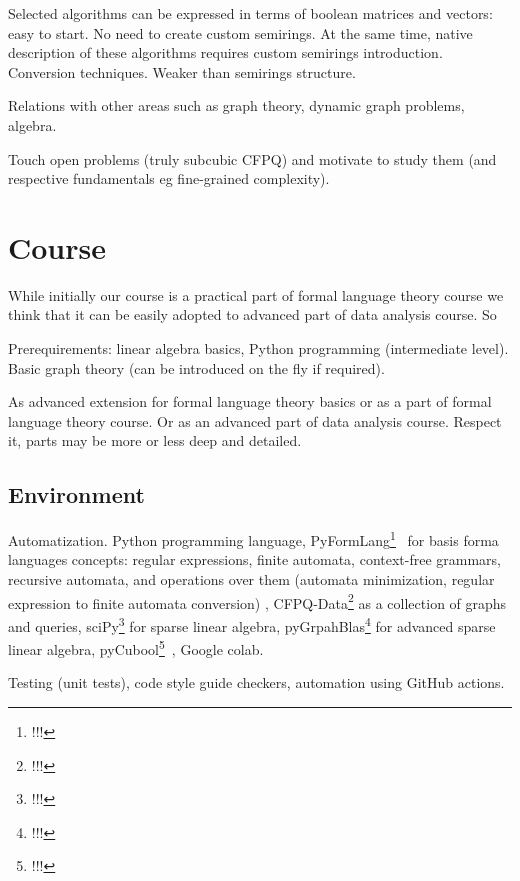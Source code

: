 \documentclass[sigconf]{acmart}
\begin{document}
Selected algorithms can be expressed in terms of boolean matrices and vectors: easy to start. No need to create custom semirings. At the same time, native description of these algorithms requires custom semirings introduction. Conversion techniques. Weaker than semirings structure. 

Relations with other areas such as graph theory, dynamic graph problems, algebra.

Touch open problems (truly subcubic CFPQ) and motivate to study them (and respective fundamentals eg fine-grained complexity).

\section{Course}

While initially our course is a practical part of formal language theory course we think that it can be easily adopted to advanced part of data analysis course. So 

Prerequirements:  linear algebra basics, Python programming (intermediate level). Basic graph theory (can be introduced on the fly if required).

As advanced extension for formal language theory basics or as a part of formal language theory course. Or as an advanced part of data analysis course. Respect it, parts may be more or less deep and detailed.



\subsection{Environment}

Automatization. Python programming language, PyFormLang\footnote{!!!}~\cite{10.1145/3408877.3432464} for basis forma languages concepts: regular expressions, finite automata, context-free grammars, recursive automata, and operations over them (automata minimization, regular expression to finite automata conversion) , CFPQ-Data\footnote{!!!} as a collection of graphs and queries, sciPy\footnote{!!!} for sparse linear algebra, pyGrpahBlas\footnote{!!!} for advanced sparse linear algebra, pyCubool\footnote{!!!}~\cite{!!!}, Google colab.

Testing (unit tests), code style guide checkers, automation using GitHub actions.
\end{document}
